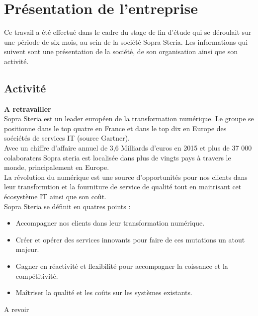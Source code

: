 \chapter*{Présentation de l'entreprise}

Ce travail a été effectué dans le cadre du stage de fin d'étude qui se déroulait sur une période de six mois, au sein de la société Sopra Steria.
Les informations qui suivent sont une présentation de la société, de son organisation ainsi que son activité.

\section{Activité}

\textbf{A retravailler}\\

Sopra Steria est un leader européen de la transformation numérique. Le groupe se positionne dans le top quatre en France et dans le top dix en Europe des soéciétés de services IT (source Gartner).\\
Avec un chiffre d'affaire annuel de 3,6 Milliards d'euros en 2015 et plus de 37 000 colaboraters Sopra steria est localisée dans plus de vingts pays à travers le monde, principalement en Europe.\\

La révolution du numérique est une source d'opportunités pour nos clients dans leur transformtion et la fourniture de service de qualité tout en maitrisant cet écosystème IT ainsi que son coût.\\
Sopra Steria se définit en quatres points :

\begin{itemize}
    \item Accompagner nos clients dans leur transformation numérique.
    \item Créer et opérer des services innovants pour faire de ces mutations un atout majeur.
    \item Gagner en réactivité et flexibilité pour accompagner la coissance et la compétitivité.
    \item Maîtriser la qualité et les coûts sur les systèmes existants.
\end{itemize}

A revoir
